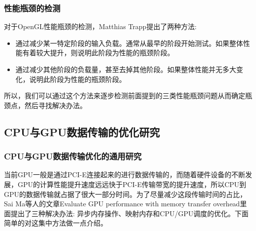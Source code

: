 \subsubsection{性能瓶颈的检测}

对于OpenGL性能瓶颈的检测，Matthias Trapp提出了两种方法:

\begin{itemize}
\item{}通过减少某一特定阶段的输入负载。通常从最早的阶段开始测试。如果整体性能有着较大提升，则说明此阶段为性能的瓶颈阶段。
\item{}通过减少其他阶段的负载量，甚至去掉其他阶段。如果整体性能并无多大变化，说明此阶段为性能的瓶颈阶段。
\end{itemize}

所以，我们可以通过这个方法来逐步检测前面提到的三类性能瓶颈问题从而确定瓶颈点，然后寻找解决办法。

\subsection{CPU与GPU数据传输的优化研究}

\subsubsection{CPU与GPU数据传输优化的通用研究}
当前GPU一般是通过PCI-E连接起来的进行数据传输的，而随着硬件设备的不断发展，GPU的计算性能提升速度远远快于PCI-E传输带宽的提升速度，所以CPU到GPU的数据传输就占据了很大一部分时间。为了尽量减少这段传输时间的占比，Sai Ma等人的文章Evaluate GPU performance with memory transfer overhead\cite{Evaluate-GPU}里面提出了三种解决办法: 异步内存操作、映射内存和CPU/GPU调度的优化。下面简单的对这集中方法做一点介绍。

